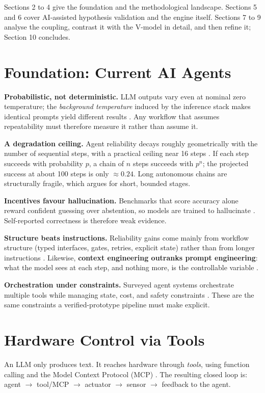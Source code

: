 \documentclass[11pt,a4paper]{article}
\begin{document}
Sections 2 to 4 give the foundation and the methodological landscape. Sections 5 and 6
cover AI-assisted hypothesis validation and the engine itself. Sections 7 to 9 analyse
the coupling, contrast it with the V-model in detail, and then refine it; Section 10
concludes.

\section{Foundation: Current AI Agents}

\textbf{Probabilistic, not deterministic.} LLM outputs vary even at nominal zero
temperature; the \emph{background temperature} induced by the inference stack makes
identical prompts yield different results \cite{pith2026}. Any workflow that assumes
repeatability must therefore measure it rather than assume it.

\textbf{A degradation ceiling.} Agent reliability decays roughly geometrically with the
number of sequential steps, with a practical ceiling near 16 steps \cite{mittal2026}. If
each step succeeds with probability $p$, a chain of $n$ steps succeeds with
$p^{n}$; the projected success at about 100 steps is only $\approx 0.24$. Long
autonomous chains are structurally fragile, which argues for short, bounded stages.

\textbf{Incentives favour hallucination.} Benchmarks that score accuracy alone reward
confident guessing over abstention, so models are trained to hallucinate
\cite{kalai2026}. Self-reported correctness is therefore weak evidence.

\textbf{Structure beats instructions.} Reliability gains come mainly from workflow
structure (typed interfaces, gates, retries, explicit state) rather than from longer
instructions \cite{nerd2026}. Likewise, \textbf{context engineering outranks prompt
engineering}: what the model sees at each step, and nothing more, is the controllable
variable \cite{anthropic2026}.

\textbf{Orchestration under constraints.} Surveyed agent systems orchestrate multiple
tools while managing state, cost, and safety constraints \cite{tooluse2026}. These are
the same constraints a verified-prototype pipeline must make explicit.

\section{Hardware Control via Tools}

An LLM only produces text. It reaches hardware through \emph{tools}, using function
calling and the Model Context Protocol (MCP) \cite{mcp2025,tooluse2026}. The resulting
closed loop is: agent $\to$ tool/MCP $\to$ actuator $\to$ sensor $\to$ feedback to the
agent.
\end{document}
